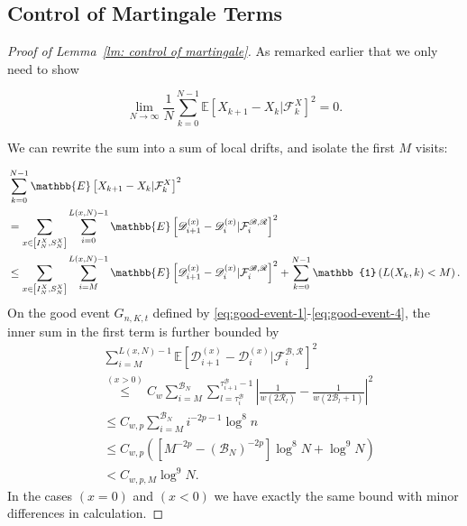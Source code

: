 \documentclass[EJP]{ejpecp} %
\begin{document}
\subsection{Control of Martingale Terms } 
\begin{proof}[Proof of Lemma~\ref{lm: control of martingale}]
	As remarked earlier that we only need to show
	
	\[
	\lim_{N \to \infty } \frac{1}{N} \sum_{k = 0}^{N-1} \mathbb{E}\left[ X_{k+1} - X_k | \mathcal{F}_k^X \right]^2 = 0
	.\] 
	
	
	We can rewrite the sum into a sum of local drifts, and isolate the first $M$ visits:
	
	\begin{align}
		&\sum_{k = 0}^{N-1} \mathbb{E}\left[ X_{k+1} - X_k | \mathcal{F}_k^X \right]^2
		\notag
		\\
		&= \sum_{x \in \left[ I_N^X, S_N^X \right]} \sum_{i = 0}^{L(x, N) - 1} \mathbb{E}\left[ \mathscr{D}_{i+1}^{(x)} - \mathscr{D}_i^{(x)} | \mathcal{F}_{i}^{\mathscr{B}, \mathscr{R}} \right]^2  
		\notag
		\\
		&\le  \sum_{x \in \left[ I_N^X, S_N^X \right]} \sum_{i = M}^{L(x,N) - 1} \mathbb{E}\left[ \mathscr{D}_{i+1}^{(x)} - \mathscr{D}_i^{(x)} | \mathcal{F}_{i}^{\mathscr{B}, \mathscr{R}} \right]^2  + 
		\sum_{k = 0}^{N - 1} \mathbb{1}\left( L(X_k, k) <  M \right) 
		\label{eq:lem-martingale-1}
		.\end{align}
	On the good event $G_{n, K, t}$ defined by \eqref{eq:good-event-1}-\eqref{eq:good-event-4},
	the inner sum in the first term is further bounded by
	\begin{align*}
		&\sum_{i =M}^{ L(x, N) - 1} \mathbb{E}\left[ \mathscr{D}_{i+1}^{(x)} - \mathscr{D}_i^{(x)} | \mathcal{F}_{i}^{\mathscr{B}, \mathscr{R}} \right]^2\\
		&\stackrel{(x > 0)}{\le} C_w \sum_{i = M}^{\mathscr{B}_N} \sum_{l = \tau_i^{\mathscr{B}}}^{\tau_{i+1}^{\mathscr{B}}-1} 
		\left| \frac{1}{w(2 \mathscr{R}_l)} - \frac{1}{w\left( 2 \mathscr{B}_l + 1 \right) } \right|^2 \\
		&\le C_{w, p} \sum_{i = M}^{\mathscr{B}_N} i^{- 2 p - 1} \log^8 n  \\
		&\le C_{w, p} \left(\left[ M^{- 2 p} -\left(  \mathscr{B}_N \right) ^{- 2 p} \right] \log^8 N + \log^9 N\right)  \\
		&< C_{w, p, M} \log^9 N
		.
	\end{align*}
	In the cases $(x=0)$ and $(x < 0)$ we have exactly the same bound with minor differences in calculation.
	

\end{proof}
\end{document}
